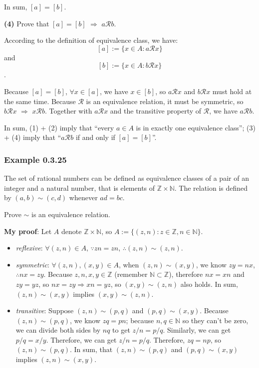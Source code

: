 \documentclass[12pt, letterpaper, oneside]{book}
\begin{document}
In sum, $[a] = [b]$.

\textbf{(4)} Prove that $[a] = [b]$ $\Rightarrow$ $a \mathcal{R} b$.

According to the definition of equivalence class, we have: \[[a] := \{x \in A:
  a \mathcal{R} x\}\] and \[[b] := \{x \in A: b \mathcal{R} x\}\].

Because $[a] = [b]$, $\forall x \in [a]$, we have $x \in [b]$, so $a
  \mathcal{R} x$ and $b \mathcal{R} x$ must hold at the same time. Because
$\mathcal{R}$ is an equivalence relation, it must be symmetric, so
$b \mathcal{R} x$ $\Rightarrow$ $x \mathcal{R} b$. Together with
$a \mathcal{R} x$ and the transitive property of $\mathcal{R}$, we have
$a \mathcal{R} b$.

In sum, (1) + (2) imply that ``every $a \in A$ is in exactly one equivalence
class''; (3) + (4) imply that ``$a \mathcal{R} b$ if and only if $[a] = [b]$''.

\subsubsection{Example 0.3.25}

The set of rational numbers can be defined as equivalence classes of a pair of
an integer and a natural number, that is elements of $\mathbb{Z} \times
  \mathbb{N}$. The relation is defined by $(a, b) \sim (c, d)$ whenever $ad = bc$.

Prove $\sim$ is an equivalence relation.

\colorbox{lime!100}{\textbf{My proof}}: Let $A$ denote $\mathbb{Z} \times
  \mathbb{N}$, so $A := \{(z, n): z \in \mathbb{Z}, n \in \mathbb{N}\}$.

\begin{itemize}
  \item \textit{reflexive}: $\forall (z, n) \in A$, $\because zn = zn$,
        $\therefore (z, n) \sim (z, n)$.
  \item \textit{symmetric}: $\forall (z, n), (x, y) \in A$, when $(z, n) \sim
          (x, y)$, we know $zy = nx$, $\therefore nx = zy$. Because $z, n, x, y \in
          \mathbb{Z}$ (remember $\mathbb{N} \subset \mathbb{Z}$), therefore $nx = xn$
        and $zy = yz$, so $nx = zy \Rightarrow xn = yz$, so $(x, y) \sim (z, n)$
        also holds. In sum, $(z, n) \sim (x, y)$ implies $(x, y) \sim (z, n)$.
  \item \textit{transitive}: Suppose $(z, n) \sim (p, q)$ and $(p, q) \sim
          (x, y)$. Because $(z, n) \sim (p, q)$, we know $zq = pn$; because $n, q \in
          \mathbb{N}$ so they can't be zero, we can divide both sides by $nq$ to get
        $z/n = p/q$. Similarly, we can get $p/q = x/y$. Therefore, we can get $z/n
          = p/q$. Therefore, $zq = np$, so $(z, n) \sim (p, q)$. In sum, that $(z, n)
          \sim (p, q)$ and $(p, q) \sim (x, y)$ implies $(z, n) \sim (x, y)$.
\end{itemize}
\end{document}
